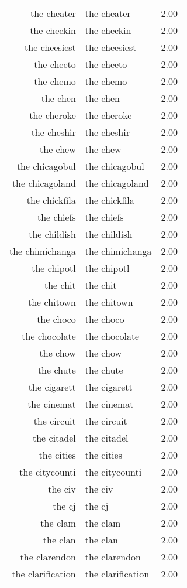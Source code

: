\begin{table}[ht]
\begin{tabular}{rlr}
  the cheater & the cheater & 2.00 \\ 
  the checkin & the checkin & 2.00 \\ 
  the cheesiest & the cheesiest & 2.00 \\ 
  the cheeto & the cheeto & 2.00 \\ 
  the chemo & the chemo & 2.00 \\ 
  the chen & the chen & 2.00 \\ 
  the cheroke & the cheroke & 2.00 \\ 
  the cheshir & the cheshir & 2.00 \\ 
  the chew & the chew & 2.00 \\ 
  the chicagobul & the chicagobul & 2.00 \\ 
  the chicagoland & the chicagoland & 2.00 \\ 
  the chickfila & the chickfila & 2.00 \\ 
  the chiefs & the chiefs & 2.00 \\ 
  the childish & the childish & 2.00 \\ 
  the chimichanga & the chimichanga & 2.00 \\ 
  the chipotl & the chipotl & 2.00 \\ 
  the chit & the chit & 2.00 \\ 
  the chitown & the chitown & 2.00 \\ 
  the choco & the choco & 2.00 \\ 
  the chocolate & the chocolate & 2.00 \\ 
  the chow & the chow & 2.00 \\ 
  the chute & the chute & 2.00 \\ 
  the cigarett & the cigarett & 2.00 \\ 
  the cinemat & the cinemat & 2.00 \\ 
  the circuit & the circuit & 2.00 \\ 
  the citadel & the citadel & 2.00 \\ 
  the cities & the cities & 2.00 \\ 
  the citycounti & the citycounti & 2.00 \\ 
  the civ & the civ & 2.00 \\ 
  the cj & the cj & 2.00 \\ 
  the clam & the clam & 2.00 \\ 
  the clan & the clan & 2.00 \\ 
  the clarendon & the clarendon & 2.00 \\ 
  the clarification & the clarification & 2.00 \\ 

\end{tabular}
\end{table}
